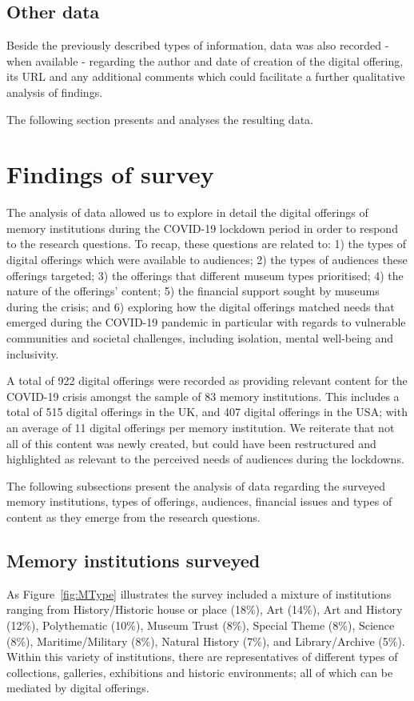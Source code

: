 \documentclass{egpubl}
\begin{document}
\subsection{Other data}
\label{other}

Beside the previously described types of information, data was also recorded - when available - regarding the author and date of creation of the digital offering, its URL and any additional comments which could facilitate a further qualitative analysis of findings.


The following section presents and analyses the resulting data. 
 

\section{Findings of survey}
\label{find}
The analysis of data allowed us to explore in detail the digital offerings of memory institutions during the COVID-19 lockdown period in order to respond to the research questions. To recap, these questions are related to: 1) the types of digital offerings which were available to audiences; 2) the types of audiences these offerings targeted; 3) the offerings that different museum types prioritised; 4) the nature of the offerings' content; 5) the financial support sought by museums during the crisis; and 6) exploring how the digital offerings matched needs that emerged during the COVID-19 pandemic in particular with regards to vulnerable communities and societal challenges, including isolation, mental well-being and inclusivity. 

A total of 922 digital offerings were recorded as providing relevant content for the COVID-19 crisis amongst the sample of 83 memory institutions. This includes a total of 515 digital offerings in the UK, and 407 digital offerings in the USA; with an average of 11 digital offerings per memory institution. We reiterate that not all of this content was newly created, but could have been restructured and highlighted as relevant to the perceived needs of audiences during the lockdowns. 

The following subsections present the analysis of data regarding the surveyed memory institutions, types of offerings, audiences, financial issues and types of content as they emerge from the research questions.

\subsection{Memory institutions surveyed}
\label{inst}
As Figure~\ref{fig:MType} illustrates the survey included a mixture of institutions ranging from History/Historic house or place (18\%), Art (14\%), Art and History (12\%), Polythematic (10\%), Museum Trust (8\%), Special Theme (8\%), Science (8\%), Maritime/Military (8\%), Natural History (7\%), and Library/Archive (5\%). Within this variety of institutions, there are representatives of different types of collections, galleries, exhibitions and historic environments; all of which can be mediated by digital offerings. 
\end{document}
